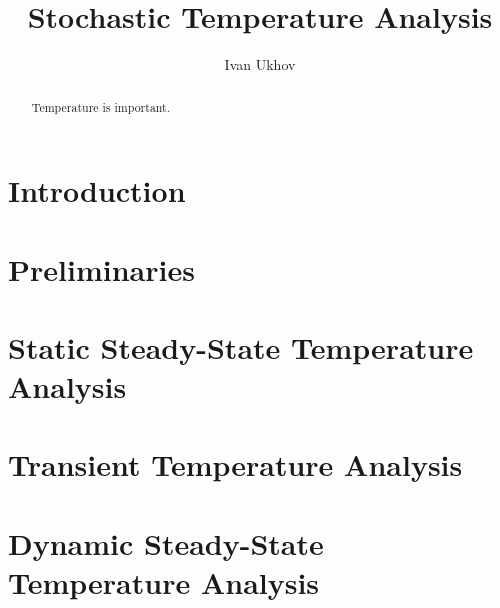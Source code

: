 \documentclass[conference]{IEEEtran}
\begin{document}
  \title{Stochastic Temperature Analysis}
  \author{Ivan Ukhov}

  \maketitle

  \begin{abstract}
    Temperature is important.
  \end{abstract}

  \section{Introduction}  
  

  \section{Preliminaries}
  

  \section{Static Steady-State Temperature Analysis} 
  

  \section{Transient Temperature Analysis} 
  

  \section{Dynamic Steady-State Temperature Analysis} 
  

  
  
\end{document}
